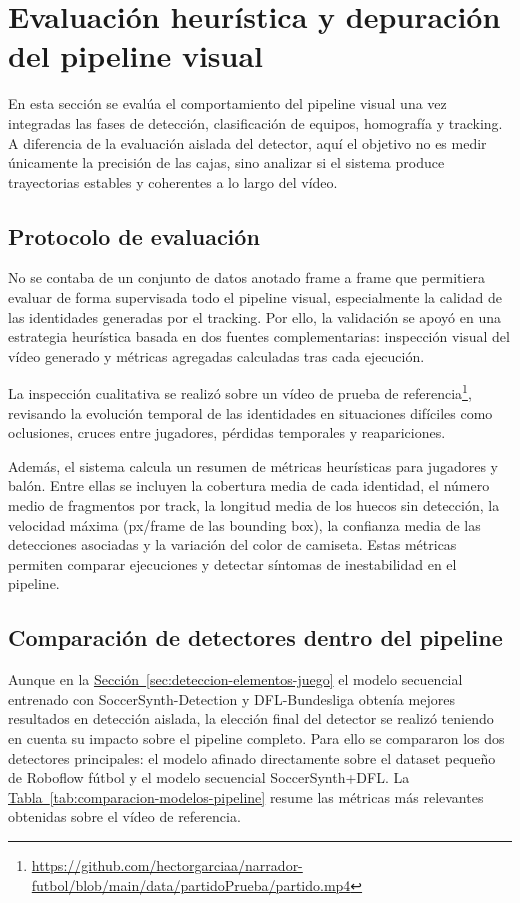 \section{Evaluación heurística y depuración del pipeline visual}
\label{sec:evaluacion-heuristica-depuracion}

En esta sección se evalúa el comportamiento del pipeline visual una vez integradas las fases de detección, clasificación de equipos, homografía y tracking. A diferencia de la evaluación aislada del detector, aquí el objetivo no es medir únicamente la precisión de las cajas, sino analizar si el sistema produce trayectorias estables y coherentes a lo largo del vídeo.


\subsection{Protocolo de evaluación}

No se contaba de un conjunto de datos anotado frame a frame que permitiera evaluar de forma supervisada todo el pipeline visual, especialmente la calidad de las identidades generadas por el tracking. Por ello, la validación se apoyó en una estrategia heurística basada en dos fuentes complementarias: inspección visual del vídeo generado y métricas agregadas calculadas tras cada ejecución.

La inspección cualitativa se realizó sobre un vídeo de prueba de referencia\footnote{\url{https://github.com/hectorgarciaa/narrador-futbol/blob/main/data/partidoPrueba/partido.mp4}}, revisando la evolución temporal de las identidades en situaciones difíciles como oclusiones, cruces entre jugadores, pérdidas temporales y reapariciones.

Además, el sistema calcula un resumen de métricas heurísticas para jugadores y balón. Entre ellas se incluyen la cobertura media de cada identidad, el número medio de fragmentos por track, la longitud media de los huecos sin detección, la velocidad máxima (px/frame de las bounding box), la confianza media de las detecciones asociadas y la variación del color de camiseta. Estas métricas permiten comparar ejecuciones y detectar síntomas de inestabilidad en el pipeline.

\subsection{Comparación de detectores dentro del pipeline}

Aunque en la \hyperref[sec:deteccion-elementos-juego]{Sección~\ref*{sec:deteccion-elementos-juego}} el modelo secuencial entrenado con SoccerSynth-Detection y DFL-Bundesliga obtenía mejores resultados en detección aislada, la elección final del detector se realizó teniendo en cuenta su impacto sobre el pipeline completo. Para ello se compararon los dos detectores principales: el modelo afinado directamente sobre el dataset pequeño de Roboflow fútbol y el modelo secuencial SoccerSynth+DFL. La \hyperref[tab:comparacion-modelos-pipeline]{Tabla~\ref*{tab:comparacion-modelos-pipeline}} resume las métricas más relevantes obtenidas sobre el vídeo de referencia.

